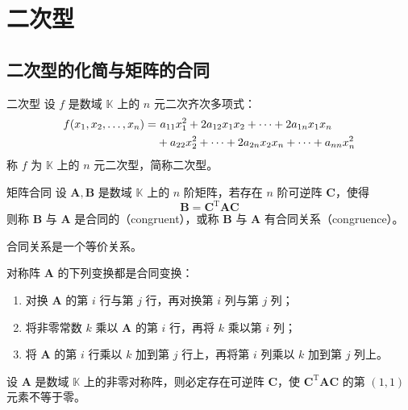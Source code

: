 \chapter{二次型}


\section{二次型的化简与矩阵的合同}

\begin{definition}{二次型}
    设 $f$ 是数域 $\mathbb{K}$ 上的 $n$ 元二次齐次多项式：
    \begin{align}
        f(x_1, x_2, \ldots, x_n) = & \ a_{11}x_{1}^{2} + 2a_{12}x_{1}x_{2} + \cdots + 2a_{1n}x_{1}x_{n}       \notag \\
                                   & + a_{22}x_{2}^{2} + \cdots + 2a_{2n}x_{2}x_{n} + \cdots + a_{nn}x_{n}^{2}
    \end{align}
    称 $f$ 为 $\mathbb{K}$ 上的 $n$ 元二次型，简称二次型。
\end{definition}

\begin{definition}{矩阵合同}
    设 $\bm{A}, \bm{B}$ 是数域 $\mathbb{K}$ 上的 $n$ 阶矩阵，若存在 $n$ 阶可逆阵 $\bm{C}$，使得
    \[
        \bm{B} = \bm{C}^{\mathrm{T}}\bm{AC}
    \]
    则称 $\bm{B}$ 与 $\bm{A}$ 是合同的（congruent），或称 $\bm{B}$ 与 $\bm{A}$ 有合同关系（congruence）。
\end{definition}

\begin{remark}
    合同关系是一个等价关系。
\end{remark}

\begin{lemma}\label{lem:8.1.1}
    对称阵 $\bm{A}$ 的下列变换都是合同变换：
    \begin{enumerate}
        \item 对换 $\bm{A}$ 的第 $i$ 行与第 $j$ 行，再对换第 $i$ 列与第 $j$ 列；
        \item 将非零常数 $k$ 乘以 $\bm{A}$ 的第 $i$ 行，再将 $k$ 乘以第 $i$ 列；
        \item 将 $\bm{A}$ 的第 $i$ 行乘以 $k$ 加到第 $j$ 行上，再将第 $i$ 列乘以 $k$ 加到第 $j$ 列上。
    \end{enumerate}
\end{lemma}

\begin{lemma}
    设 $\bm{A}$ 是数域 $\mathbb{K}$ 上的非零对称阵，则必定存在可逆阵 $\bm{C}$，使 $\bm{C}^{\mathrm{T}}\bm{AC}$ 的第 $(1, 1)$ 元素不等于零。
\end{lemma}

